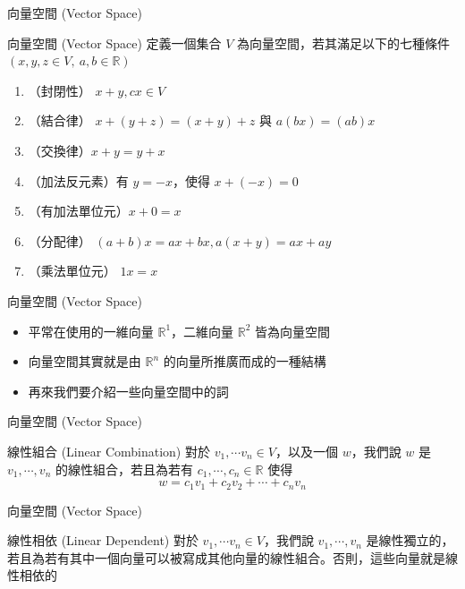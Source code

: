 \documentclass[aspectratio=169]{beamer}
\begin{document}
    \begin{frame}{向量空間 (Vector Space)}
        \begin{block}{向量空間 (Vector Space)}
            定義一個集合 $V$ 為向量空間，若其滿足以下的七種條件 $(x,y,z \in V, \ a,b \in \mathbb{R})$
            \begin{enumerate}
                \item （封閉性） $x+y, cx \in V$ 
                \item （結合律） $x + (y + z) = (x + y) + z$ 與 $a(bx) = (ab)x$ 
                \item （交換律）$x + y = y + x$ 
                \item （加法反元素）有 $y = -x$，使得 $x+(-x) = 0$
                \item （有加法單位元）$x+0=x$ 
                \item （分配律） $(a+b)x = ax+bx, a(x+y) = ax+ay$ 
                \item （乘法單位元） $1x = x$ 
            \end{enumerate}
        \end{block}
    \end{frame}
    
    \begin{frame}{向量空間 (Vector Space)}
        \begin{itemize}
            \item 平常在使用的一維向量 $\mathbb{R}^1$，二維向量 $\mathbb{R}^2$ 皆為向量空間
            \item 向量空間其實就是由 $\mathbb{R}^n$ 的向量所推廣而成的一種結構
            \item 再來我們要介紹一些向量空間中的詞
        \end{itemize}
    \end{frame}
    
    \begin{frame}{向量空間 (Vector Space)}
        \begin{block}{線性組合 (Linear Combination)}
            對於 $v_1, \cdots v_n \in V$，以及一個 $w$，我們說 $w$ 是 $v_1,\cdots,v_n$ 的線性組合，若且為若有 $c_1,\cdots,c_n \in \mathbb{R}$ 使得
            $$w = c_1v_1 + c_2v_2 + \cdots + c_nv_n$$
        \end{block}
    \end{frame}
    
    \begin{frame}{向量空間 (Vector Space)}
        \begin{block}{線性相依 (Linear Dependent)}
            對於 $v_1, \cdots v_n \in V$，我們說 $v_1, \cdots, v_n$ 是線性獨立的，若且為若有其中一個向量可以被寫成其他向量的線性組合。否則，這些向量就是線性相依的
        \end{block}
    \end{frame}
    
\end{document}
